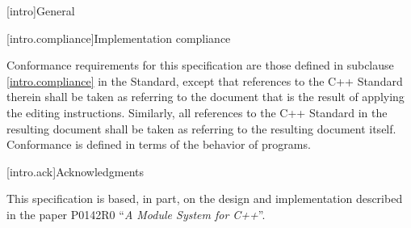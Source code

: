 
[intro]{General}


[intro.compliance]{Implementation compliance}

\pnum
Conformance requirements for this specification are those 
defined in subclause \ref{intro.compliance} in the \Cpp Standard,
except that references to the C++ Standard therein shall
be taken as referring to the document that is the result
of applying the editing instructions.  Similarly, all references
to the C++ Standard in the resulting document shall be taken
as referring to the resulting document itself.
\enternote 
Conformance is defined in terms of the behavior of programs.
\exitnote








[intro.ack]{Acknowledgments}


\pnum
This specification is based, in part, on the design and implementation
described in the paper P0142R0 ``\emph{A Module System for C++}''.
